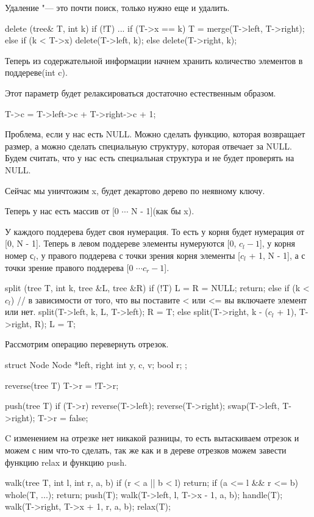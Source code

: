 Удаление "--- это почти поиск, только нужно еще и удалить.

\begin{cppcode}
delete (tree& T, int k) {
    if (!T) {...}
    if (T->x == k) {
        T = merge(T->left, T->right);
    } else {
        if (k < T->x) {
            delete(T->left, k);
        } else {
            delete(T->right, k);
        }
    }
}
\end{cppcode}

Теперь из содержательной информации начнем хранить количество элементов в поддереве(int c).

Этот параметр будет релаксироваться достаточно естественным образом.

T->c = T->left->c + T->right->c + 1;

Проблема, если у нас есть NULL. Можно сделать функцию, которая возвращает размер,
а можно сделать специальную структуру, которая отвечает за NULL. Будем считать, что у нас есть специальная структура и
не будет проверять на NULL.


Сейчас мы уничтожим x, будет декартово дерево по неявному ключу.

Теперь у нас есть массив от [0 $\cdots$ N - 1](как бы x).

У каждого поддерева будет своя нумерация. То есть у корня будет нумерация от [0, N - 1]. Теперь в
левом поддереве элементы нумеруются [0, $c_l - 1$], у корня номер $с_l$, у правого поддерева с точки зрения корня
элементы [$c_l$ + 1, N - 1], а с точки зрение правого поддерева [0 $\cdots c_r - 1$].

\begin{cppcode}
split (tree T, int k, tree &L, tree &R) {
    if (!T) {
        L = R = NULL;
        return;
    } else if (k < $c_l$) {  // в зависимости от того, что вы поставите < или <= вы включаете элемент или нет.
        split(T->left, k, L, T->left);
        R = T;
    } else {
        split(T->right, k - ($c_l$ + 1), T->right, R);
        L = T;
    }
}
\end{cppcode} 

Рассмотрим операцию перевернуть отрезок.

\begin{cppcode}
struct Node {
   Node *left, right
   int y, c, v;
   bool r;
};

reverse(tree T) {
    T->r = !T->r;
}

push(tree T) {
    if (T->r) {
        reverse(T->left);
        reverse(T->right);
        swap(T->left, T->right);
        T->r = false;
    }    
}
\end{cppcode}

C изменением на отрезке нет никакой разницы, то есть вытаскиваем отрезок и можем с ним что-то сделать, так 
же как и в дереве отрезков можем завести функцию relax и функцию push.

\begin{cppcode}
walk(tree T, int l, int r, a, b) {
    if (r < a || b < l) return;
    if (a <= l && r <= b) {
        whole(T, ...);
        return;
    }
    push(T);
    walk(T->left, l, T->x - 1, a, b);
    handle(T);
    walk(T->right, T->x + 1, r, a, b);
    relax(T);
}
\end{cppcode}
